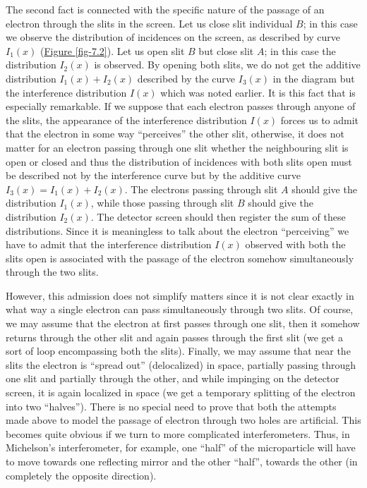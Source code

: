 \documentclass[a4paper,sfsidenotes,colorlinks=true]{tufte-book}
\numberwithin{equation}{section}
\numberwithin{figure}{section}
\begin{document}
The second fact is connected with the specific nature of the passage of an electron through the slits in the screen. Let us close slit individual $B$; in this case we observe the distribution of incidences on the screen, as described by curve $I_{1}(x)$ (\hyperref[fig-7.2]{Figure \ref{fig-7.2}}). Let us open slit $B$ but close slit $A$; in this case the distribution $I_{2}(x)$ is observed. By opening both slits, we do not get the additive distribution $I_{1}(x) + I_{2}(x)$ described by the curve $I_{3}(x)$ in the diagram but the interference distribution $I(x)$ which was noted earlier. It is this fact that is especially remarkable. If we suppose that each electron passes through anyone of the slits, the appearance of the interference distribution $I(x)$ forces us to admit that the electron in some way ``perceives'' the other slit, otherwise, it does not matter for an electron passing through one slit whether the neighbouring slit is open or closed and thus the distribution of incidences with both slits open must be described not by the interference curve but by the additive curve $I_{3}(x) = I_{1}(x)+ I_{2}(x)$. The electrons passing through slit $A$ should give the distribution $I_{1}(x)$, while those passing through slit $B$ should give the distribution $I_{2}(x)$. The detector screen should then register the sum of these distributions. Since it is meaningless to talk about the electron ``perceiving'' we have to admit that the interference distribution $I(x)$ observed with both the slits open is associated with the passage of the electron somehow simultaneously through the two slits.


However, this admission does not simplify matters since it is not clear exactly in what way a single electron can pass simultaneously through two slits. Of course, we may assume that the electron at first passes through one slit, then it somehow returns through the other slit and again passes through the first slit (we get a sort of loop encompassing both the slits). Finally, we may assume that near the slits the electron is ``spread out'' (delocalized) in space, partially passing through one slit and partially through the other, and while impinging on the detector screen, it is again localized in space (we get a temporary splitting of the electron into two ``halves''). There is no special need to prove that both the attempts made above to model the passage of electron through two holes are artificial. This becomes quite obvious if we turn to more complicated interferometers. Thus, in Michelson's interferometer, for example, one ``half'' of the microparticle will have to move towards one reflecting mirror and the other ``half'', towards the other (in completely the opposite direction).
\end{document}
